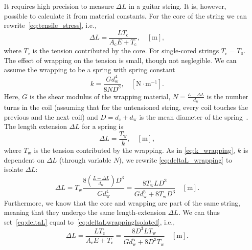 \documentclass{article}
\begin{document}
\begin{sloppy}
It requires high precision to measure $\Delta L$ in a guitar string. It is, however, possible to calculate it from material constants. For the core of the string we can rewrite~\eqref{eq:tensile_stress}, i.e.,
%
\begin{equation}\label{eq:deltaL}
    \Delta L= \frac{LT_\text{c}}{A_\text{c}E + T_\text{c}}, \quad  [\text{m}], 
\end{equation}
%
where $T_\text{c}$ is the tension contributed by the core. For single-cored strings $T_\text{c} = T_0$.
%
The effect of wrapping on the tension is small, though not neglegible. We can assume the wrapping to be a spring with spring constant~\cite{childs:mechanical_engineering}
%
\begin{equation}\label{eq:k_wrapping}
    k = \frac{Gd_\text{w}^4}{8ND^3}, \quad [\text{N}\cdot\text{m}^{-1}].
\end{equation}
%
Here, $G$ is the shear modulus of the wrapping material, $N = \frac{L - \Delta L}{d_\text{w}}$ is the number turns in the coil (assuming that for the untensioned string, every coil touches the previous and the next coil) and $D = d_\text{c}+d_\text{w}$ is the mean diameter of the spring~\cite{kemp:wound_and_unwound_strings}.
%
The length extension $\Delta L$ for a spring is
%
\begin{equation}\label{eq:deltaL_wrapping}
    \Delta L = \frac{T_\text{w}}{k}, \quad [\text{m}],
\end{equation}
%
where $T_\text{w}$ is the tension contributed by the wrapping. As in \eqref{eq:k_wrapping}, $k$ is dependent on $\Delta L$ (through variable $N$), we rewrite  \eqref{eq:deltaL_wrapping} to isolate $\Delta L$:
\begin{equation}\label{eq:deltaLwrappingIsolated}
    \Delta L = T_\text{w}\frac{8(\frac{L - \Delta L}{d_\text{w}})D^3}{Gd_\text{w}^4} = \frac{8T_\text{w}LD^3}{Gd_\text{w}^5 + 8T_\text{w}D^3} \quad [\text{m}].
\end{equation}
Furthermore, we know that the core and wrapping are part of the same string, meaning that they undergo the same length-extension $\Delta L$. We can thus set~\eqref{eq:deltaL} equal to~\eqref{eq:deltaLwrappingIsolated}, i.e., 
%
\begin{equation}
    \Delta L = \frac{LT_\text{c}}{A_\text{c}E + T_\text{c}} = \frac{8D^3LT_\text{w}}{Gd_\text{w}^5 + 8D^3T_\text{w}} \quad [\text{m}].

\end{equation}
\end{sloppy}
\end{document}
